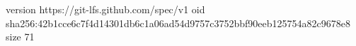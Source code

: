 version https://git-lfs.github.com/spec/v1
oid sha256:42b1cce6c7f4d14301db6c1a06ad54d9757c3752bbf90eeb125754a82c9678e8
size 71
